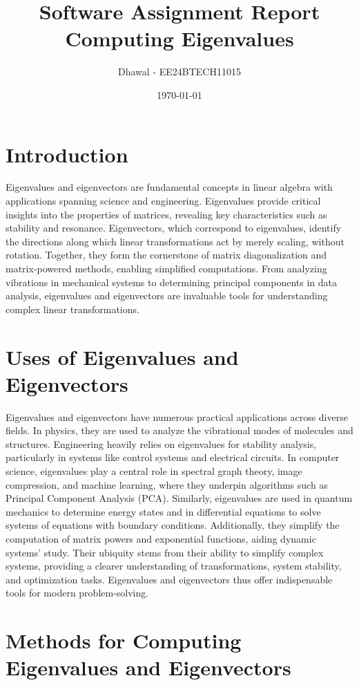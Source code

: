\documentclass[12pt,a4paper]{article}
\title{\textbf{Software Assignment Report}\\[10pt]
\textbf{Computing Eigenvalues}}
\author{Dhawal - EE24BTECH11015}
\date{\today}
\begin{document}
\maketitle
\newpage

\section*{Introduction}
Eigenvalues and eigenvectors are fundamental concepts in linear algebra with applications spanning science and engineering. Eigenvalues provide critical insights into the properties of matrices, revealing key characteristics such as stability and resonance. Eigenvectors, which correspond to eigenvalues, identify the directions along which linear transformations act by merely scaling, without rotation. Together, they form the cornerstone of matrix diagonalization and matrix-powered methods, enabling simplified computations. From analyzing vibrations in mechanical systems to determining principal components in data analysis, eigenvalues and eigenvectors are invaluable tools for understanding complex linear transformations.

\section*{Uses of Eigenvalues and Eigenvectors}
Eigenvalues and eigenvectors have numerous practical applications across diverse fields. In physics, they are used to analyze the vibrational modes of molecules and structures. Engineering heavily relies on eigenvalues for stability analysis, particularly in systems like control systems and electrical circuits. In computer science, eigenvalues play a central role in spectral graph theory, image compression, and machine learning, where they underpin algorithms such as Principal Component Analysis (PCA). Similarly, eigenvalues are used in quantum mechanics to determine energy states and in differential equations to solve systems of equations with boundary conditions. Additionally, they simplify the computation of matrix powers and exponential functions, aiding dynamic systems' study. Their ubiquity stems from their ability to simplify complex systems, providing a clearer understanding of transformations, system stability, and optimization tasks. Eigenvalues and eigenvectors thus offer indispensable tools for modern problem-solving.

\newpage
\section*{Methods for Computing Eigenvalues and Eigenvectors}
\end{document}
